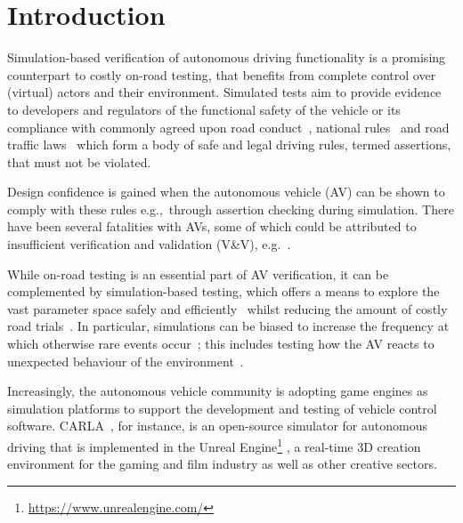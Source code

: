 \section{Introduction} \label{s:introduction}
Simulation-based verification of autonomous driving functionality is a promising counterpart to costly on-road testing, that benefits from complete control over (virtual) actors and their environment.
%
Simulated tests aim to provide evidence to developers and regulators of the functional safety of the vehicle or its compliance with commonly agreed upon road conduct~\cite{ViennaConv}, national rules~\cite{codes2015highway} and road traffic laws~\cite{RoadTraffic1988} which form a body of safe and legal driving rules, termed assertions, that must not be violated. 

Design confidence is gained when the autonomous vehicle (AV) can be shown to comply with these rules e.g.,\ through assertion checking during simulation. There have been several fatalities with AVs, some of which could be attributed to insufficient verification and validation (V\&V), e.g.~\cite{FatalityExample}. 

While on-road testing is an essential part of AV verification, it can be complemented by  simulation-based testing, which offers a means to explore the vast parameter space safely and efficiently~\cite{korosec2019waymo} whilst reducing the amount of costly road trials~\cite{kalra2016driving}.
%
In particular, simulations can be biased to increase the frequency at which otherwise rare events occur~\cite{Koopman2018}; this includes testing how the AV reacts to unexpected behaviour of the environment~\cite{RobustnessAutonomy}. 

Increasingly, the autonomous vehicle community is adopting game engines as simulation platforms to support the development and testing of vehicle control software. 
%
CARLA~\DIFdelbegin {}\DIFdelend \DIFaddbegin {}\DIFaddend , for instance, is an open-source simulator for autonomous driving that is implemented in the Unreal Engine\DIFdelbegin {}\DIFdelend \DIFaddbegin \footnote{\url{https://www.unrealengine.com/}}
\DIFaddend , a real-time 3D creation environment for the gaming and film industry as well as other creative sectors\DIFdelbegin {}\DIFdelend . 

